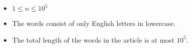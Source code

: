 \begin{itemize}
	\tightlist
	\item $1 \le n \le 10^5$
    \item The words consist of only English letters in lowercase.
	\item The total length of the words in the article is at most $10^5$.
\end{itemize}
